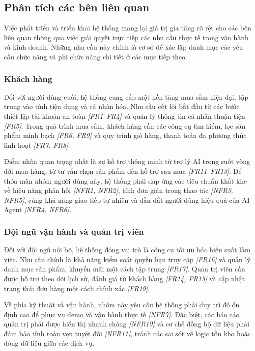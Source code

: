 \subsection{Phân tích các bên liên quan}

Việc phát triển và triển khai hệ thống mang lại giá trị gia tăng rõ rệt cho các bên liên quan thông qua việc giải quyết trực tiếp các nhu cầu thực tế trong vận hành và kinh doanh. Những nhu cầu này chính là cơ sở để xác lập danh mục các yêu cầu chức năng và phi chức năng chi tiết ở các mục tiếp theo.

\subsubsection{Khách hàng}

Đối với người dùng cuối, hệ thống cung cấp một nền tảng mua sắm hiện đại, tập trung vào tính tiện dụng và cá nhân hóa. Nhu cầu cốt lõi bắt đầu từ các bước thiết lập tài khoản an toàn \textit{[FR1--FR4]} và quản lý thông tin cá nhân thuận tiện \textit{[FR5]}. Trong quá trình mua sắm, khách hàng cần các công cụ tìm kiếm, lọc sản phẩm minh bạch \textit{[FR6, FR9]} và quy trình giỏ hàng, thanh toán đa phương thức linh hoạt \textit{[FR7, FR8]}. 

Điểm nhấn quan trọng nhất là sự hỗ trợ thông minh từ trợ lý AI trong suốt vòng đời mua hàng, từ tư vấn chọn sản phẩm đến hỗ trợ sau mua \textit{[FR11--FR13]}. Để thỏa mãn nhóm người dùng này, hệ thống phải đáp ứng các tiêu chuẩn khắt khe về hiệu năng phản hồi \textit{[NFR1, NFR2]}, tính đơn giản trong thao tác \textit{[NFR3, NFR5]}, cùng khả năng giao tiếp tự nhiên và dẫn dắt người dùng hiệu quả của AI Agent \textit{[NFR4, NFR6]}.

\subsubsection{Đội ngũ vận hành và quản trị viên}

Đối với đội ngũ nội bộ, hệ thống đóng vai trò là công cụ tối ưu hóa hiệu suất làm việc. Nhu cầu chính là khả năng kiểm soát quyền hạn truy cập \textit{[FR16]} và quản lý danh mục sản phẩm, khuyến mãi một cách tập trung \textit{[FR17]}. Quản trị viên cần được hỗ trợ theo dõi lịch sử, đánh giá từ khách hàng \textit{[FR14, FR15]} và cập nhật trạng thái đơn hàng một cách chính xác \textit{[FR19]}. 

Về phía kỹ thuật và vận hành, nhóm này yêu cầu hệ thống phải duy trì độ ổn định cao để phục vụ demo và vận hành thực tế \textit{[NFR7]}. Đặc biệt, các báo cáo quản trị phải được hiển thị nhanh chóng \textit{[NFR10]} và cơ chế đồng bộ dữ liệu phải đảm bảo tính toàn vẹn tuyệt đối \textit{[NFR11]}, tránh các sai sót về logic tồn kho hoặc dòng dữ liệu giữa các dịch vụ.

